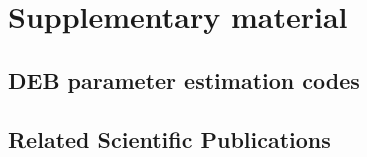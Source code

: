 \chapter{Supplementary material}\label{App1}

\clearpage
\section*{DEB parameter estimation codes}






\clearpage
\section*{Related Scientific Publications}









